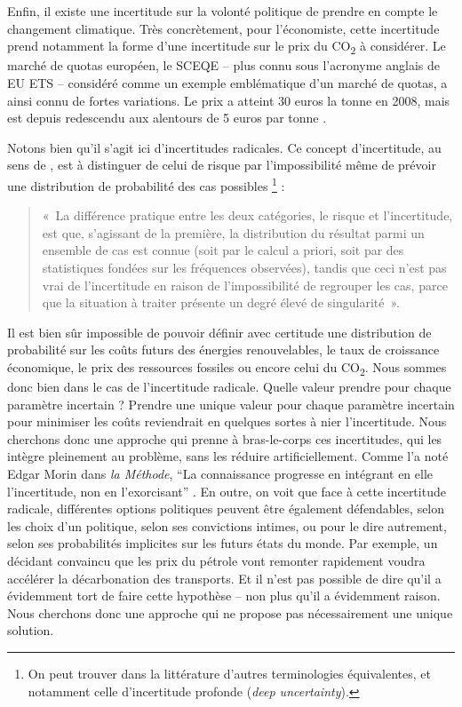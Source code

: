 Enfin, il existe une incertitude sur la volonté politique de prendre en compte le changement climatique. Très concrètement, pour l’économiste, cette incertitude prend notamment la forme d’une incertitude sur le prix du CO\textsubscript{2} à considérer. Le marché de quotas européen, le SCEQE -- plus connu sous l’acronyme anglais de EU ETS -- considéré comme un exemple emblématique d’un marché de quotas, a ainsi connu de fortes variations. Le prix a atteint 30 euros la tonne en 2008, mais est depuis redescendu aux alentours de 5 euros par tonne \citep{Marcu2016}.

Notons bien qu’il s’agit ici d’incertitudes radicales. Ce concept d’incertitude, au sens de \citet{Knight1921}, est à distinguer de celui de risque par l’impossibilité même de prévoir une distribution de probabilité des cas possibles \footnote{On peut trouver dans la littérature d’autres terminologies équivalentes, et notamment celle d'incertitude profonde (\textit{deep uncertainty}).} :
\begin{quote}
	«~La différence pratique entre les deux catégories, le risque et l’incertitude, est que, s’agissant de la première, la distribution du résultat parmi un ensemble de cas est connue (soit par le calcul a priori, soit par des statistiques fondées sur les fréquences observées), tandis que ceci n’est pas vrai de l’incertitude en raison de l’impossibilité de regrouper les cas, parce que la situation à traiter présente un degré élevé de singularité~»\citep[p. 233]{Knight1921}.
\end{quote}
Il est bien sûr impossible de pouvoir définir avec certitude une distribution de probabilité sur les coûts futurs des énergies renouvelables, le taux de croissance économique, le prix des ressources fossiles ou encore celui du CO\textsubscript{2}. Nous sommes donc bien dans le cas de l’incertitude radicale. Quelle valeur prendre pour chaque paramètre incertain ? Prendre une unique valeur pour chaque paramètre incertain pour minimiser les coûts reviendrait en quelques sortes à nier l’incertitude. Nous cherchons donc une approche qui prenne à bras-le-corps ces incertitudes, qui les intègre pleinement au problème, sans les réduire artificiellement. Comme l’a noté Edgar Morin dans \textit{la Méthode}, “La connaissance progresse en intégrant en elle l'incertitude, non en l'exorcisant” \citep{Morin2008}.
En outre, on voit que face à cette incertitude radicale, différentes options politiques peuvent être également défendables, selon les choix d’un politique, selon ses convictions intimes, ou pour le dire autrement, selon ses probabilités implicites sur les futurs états du monde. Par exemple, un décidant convaincu que les prix du pétrole vont remonter rapidement voudra accélérer la décarbonation des transports. Et il n’est pas possible de dire qu’il a évidemment tort de faire cette hypothèse – non plus qu’il a évidemment raison. Nous cherchons donc une approche qui ne propose pas nécessairement une unique solution.

